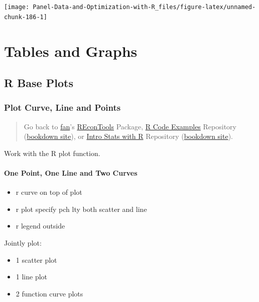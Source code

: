 \documentclass[
]{book}
\providecommand{\tightlist}{%
  \setlength{\itemsep}{0pt}\setlength{\parskip}{0pt}}
\begin{document}
\begin{center}\texttt{[image: Panel-Data-and-Optimization-with-R\_files/figure-latex/unnamed-chunk-186-1]} \end{center}

\hypertarget{tables-and-graphs}{%
\chapter{Tables and Graphs}\label{tables-and-graphs}}

\hypertarget{r-base-plots}{%
\section{R Base Plots}\label{r-base-plots}}

\hypertarget{plot-curve-line-and-points}{%
\subsection{Plot Curve, Line and Points}\label{plot-curve-line-and-points}}

\begin{quote}
Go back to \href{http://fanwangecon.github.io/}{fan}'s \href{https://fanwangecon.github.io/REconTools/}{REconTools} Package, \href{https://fanwangecon.github.io/R4Econ/}{R Code Examples} Repository (\href{https://fanwangecon.github.io/R4Econ/bookdown}{bookdown site}), or \href{https://fanwangecon.github.io/Stat4Econ/}{Intro Stats with R} Repository (\href{https://fanwangecon.github.io/Stat4Econ/bookdown}{bookdown site}).
\end{quote}

Work with the R plot function.

\hypertarget{one-point-one-line-and-two-curves}{%
\subsubsection{One Point, One Line and Two Curves}\label{one-point-one-line-and-two-curves}}

\begin{itemize}
\tightlist
\item
  r curve on top of plot
\item
  r plot specify pch lty both scatter and line
\item
  r legend outside
\end{itemize}

Jointly plot:

\begin{itemize}
\tightlist
\item
  1 scatter plot
\item
  1 line plot
\item
  2 function curve plots
\end{itemize}
\end{document}
